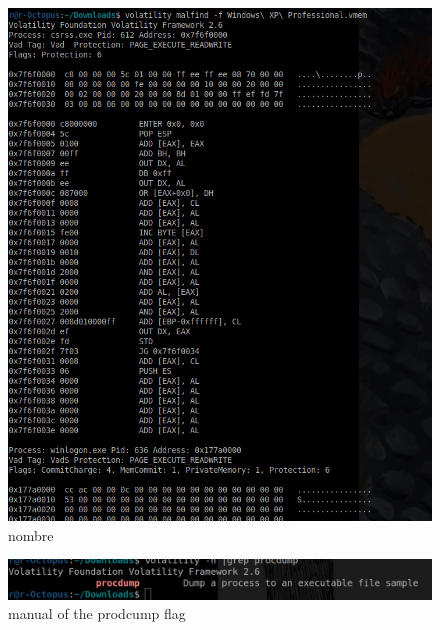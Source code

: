 \documentclass[10pt,a4paper]{article} %
\begin{document}
    \begin{figure}[h!]
        \centering
        \includegraphics[width=0.8\linewidth]{malfind.png}
        \caption{nombre}
        \label{fig}
    \end{figure}


    \begin{figure}[h!]
        \centering
        \includegraphics[width=0.8\linewidth]{procdumpin.png}
        \caption{manual of the prodcump flag}
        \label{fig}
    \end{figure}



















    \nocite{*}
    
    
\end{document}
